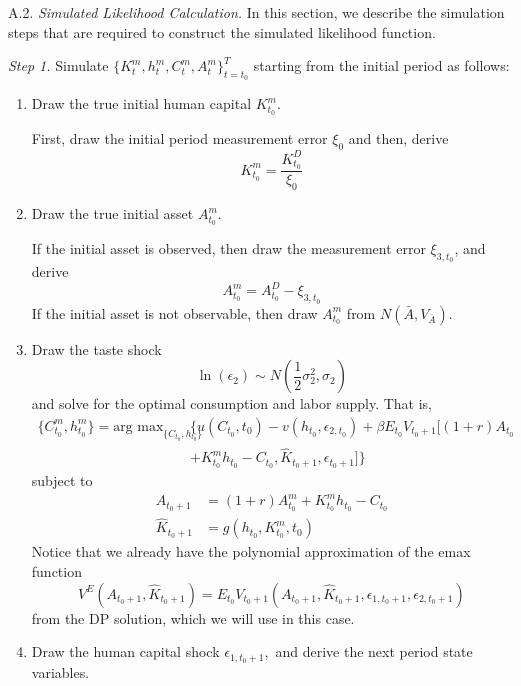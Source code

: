 \documentclass[\econtexRoot/ImaiKeane]{subfiles}
\begin{document}
\quad A.2.     \textit{Simulated Likelihood Calculation.}     In this section, we describe the simulation steps that are required to construct the simulated likelihood function. \par
\medskip
\noindent \textit{Step 1.}      Simulate $\{K_t^m, h_t^m, C_t^m, A_t^m\}_{t=t_0}^T$ starting from the initial period as follows:
\begin{enumerate}
\item  Draw the true initial human capital $K_{t_0}^m$. \par
  First, draw the initial period measurement error $\xi_0$ and then, derive
  $$K_{t_0}^m = \dfrac{K_{t_0}^D}{\xi_0}$$
  \item  Draw the true initial asset $A_{t_0}^m$. \par
    If the initial asset is observed, then draw the measurement error $\xi_{3,t_0}$, and derive
    $$A_{t_0}^m =A_{t_0}^D - \xi_{3,t_0} $$
    If the initial asset is not observable, then draw $A_{t_0}^m$ from $N(\bar{A}, V_{\bar{A}})$.
  \item Draw the taste shock
    $$ \ln(\epsilon_2) \sim N(\frac{1}{2}\sigma_2^2,\sigma_2) $$
      and solve for the optimal consumption and labor supply. That is,
      \begin{equation*}
        \begin{split}
          \{C_{t_0}^m,h_{t_0}^m\} = \text{arg max}_{ \{C_{t_0},h_{t_0}\} }& \{u(C_{t_0},t_0) - v(h_{t_0}, \epsilon_{2,t_0}) + \beta E_{t_0} V_{t_0+1}[(1+r)A_{t_0} \\
          & + K_{t_0}^m h_{t_0} - C_{t_0}, \hat{K}_{t_0 + 1}, \epsilon_{t_0 + 1}]\}
        \end{split}
        \end{equation*}
        subject to
        \begin{equation*}
        \begin{split}
          A_{t_0+1} & = (1+r)A_{t_0}^m + K_{t_0}^m h_{t_0} - C_{t_0} \\
          \hat{K}_{t_0+1}& = g(h_{t_0},  K_{t_0}^m, t_0)
        \end{split}
      \end{equation*}
      Notice that we already have the polynomial approximation of the emax function
      $$V^E ( A_{t_0+1},\hat{K}_{t_0 + 1}) = E_{t_0}V_{t_0 + 1}(A_{t_0+1},\hat{K}_{t_0 + 1}, \epsilon_{1,t_0+1}, \epsilon_{2,t_0+1})$$
      from the DP solution, which we will use in this case.
    \item Draw the human capital shock $\epsilon_{1,t_0+1},$ and derive the next period state variables.\par

\end{enumerate}
\end{document}
